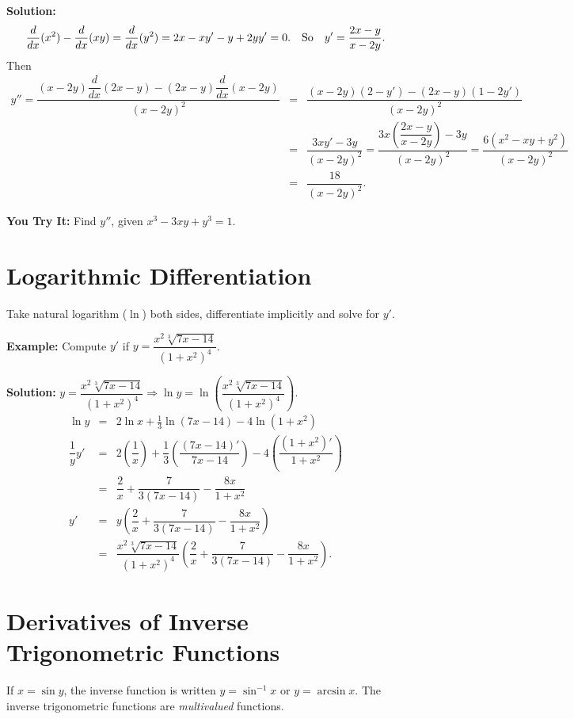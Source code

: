 \documentclass[titlepage,a4paper,12pt]{report}
\begin{document}
\noindent \textbf{Solution:} 
\begin{equation*}
\dfrac{d}{dx}(x^2)-\dfrac{d}{dx}(xy)=\dfrac{d}{dx}(y^2)=2x-xy'-y+2yy'=0. \quad \hbox{So} \quad  y'=\dfrac{2x-y}{x-2y}.
\end{equation*}
Then 
\begin{eqnarray*}
y''=\dfrac{(x-2y)\dfrac{d}{dx}(2x-y)-(2x-y)\dfrac{d}{dx}(x-2y)}{(x-2y)^2} &=& \dfrac{(x-2y)(2-y')-(2x-y)(1-2y')}{(x-2y)^2}\\
&=& \dfrac{3xy'-3y}{(x-2y)^2} = \dfrac{3x\left(\dfrac{2x-y}{x-2y}\right)-3y}{(x-2y)^2} =\dfrac{6(x^2-xy+y^2)}{(x-2y)^2}\\
&=& \dfrac{18}{(x-2y)^2}.
\end{eqnarray*}

\noindent \textbf{You Try It:} Find $y''$, given $x^3-3xy+y^3=1$.

\section{Logarithmic Differentiation}
Take natural logarithm ($\ln$) both sides, differentiate implicitly and solve for $y'$.

\noindent \textbf{Example:} Compute $y'$ if $y=\dfrac{x^2\sqrt[3]{7x-14}}{(1+x^2)^4}$.

\noindent \textbf{Solution:} $y=\dfrac{x^2\sqrt[3]{7x-14}}{(1+x^2)^4} \Rightarrow \ln y =\ln \left(\dfrac{x^2\sqrt[3]{7x-14}}{(1+x^2)^4}\right)$.
\begin{eqnarray*}
\ln y &=& 2\ln x +\frac{1}{3}\ln (7x-14) -4\ln (1+x^2) \\
\dfrac{1}{y}y' &=& 2\left(\dfrac{1}{x}\right)+\dfrac{1}{3}\left(\dfrac{(7x-14)'}{7x-14}\right)-4\left(\dfrac{(1+x^2)'}{1+x^2}\right) \\
&=& \dfrac{2}{x} +\dfrac{7}{3(7x-14)} -\dfrac{8x}{1+x^2}\\
y' &=& y\left(\dfrac{2}{x} +\dfrac{7}{3(7x-14)} -\dfrac{8x}{1+x^2}\right)\\
&=& \dfrac{x^2\sqrt[3]{7x-14}}{(1+x^2)^4} \left(\dfrac{2}{x} +\dfrac{7}{3(7x-14)} -\dfrac{8x}{1+x^2}\right).
\end{eqnarray*}
\section{Derivatives of Inverse Trigonometric Functions}
If $x=\sin y$, the inverse function is written $y=\sin ^{-1} x$ or $y=\arcsin x$. The inverse trigonometric functions are \textit{multivalued} functions.
\end{document}
